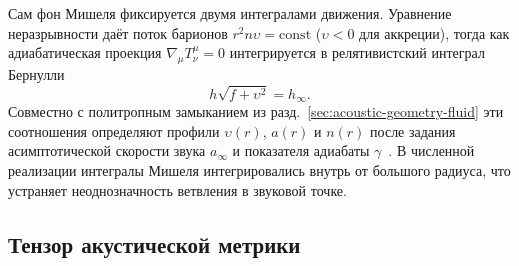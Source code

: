 \documentclass[12pt,a4paper,preprint]{elsarticle}
\begin{document}
            Сам фон Мишеля фиксируется двумя интегралами движения. Уравнение неразрывности даёт поток барионов $r^{2} n \upsilon = \mathrm{const}$ ($\upsilon<0$ для аккреции), тогда как адиабатическая проекция $\nabla_{\mu}T^{\mu}_{\nu}=0$ интегрируется в релятивистский интеграл Бернулли
            \begin{equation}
                h\sqrt{f+\upsilon^{2}} = h_{\infty} .
                \label{eq:michel-bernoulli}
            \end{equation}
            Совместно с политропным замыканием из разд.~\ref{sec:acoustic-geometry-fluid} эти соотношения определяют профили $\upsilon(r)$, $a(r)$ и $n(r)$ после задания асимптотической скорости звука $a_{\infty}$ и показателя адиабаты $\gamma$~\cite{MichelFC_AccretionOfMatterByCondensedObjects_1972, ShapiroSL_TeukolskySA_BlackHolesWhiteDwarfsAndNeutronStarsThePhysicsOfCompactObjects_2004}. В численной реализации интегралы Мишеля интегрировались внутрь от большого радиуса, что устраняет неоднозначность ветвления в звуковой точке.

        \subsection{Тензор акустической метрики}\label{subsec:acoustic-metric-tensor}
\end{document}
